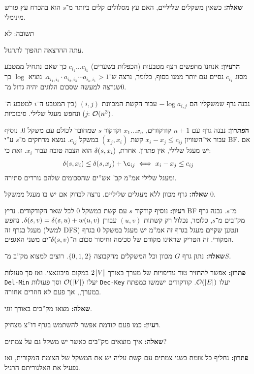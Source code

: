 \documentclass[]{../../../../tex/classes/styledArticle}
\begin{document}
	\textbf{שאלה: }כשאין משקלים שליליים, האם עץ מסלולים קלים ביותר מ־$s$ הוא בהכרח עץ פורש מינימלי. 
	
	תשובה: לא
	
	עתה ההרצאה תהפוך לתרגול. 
	
	\textbf{הרעיון: }אנחנו מחפשים רצף מטבעות (הכפלות בשערים) $c_{i_1} \dots c_{i_k}$ כך שאם נתחיל ממטבע מסוג $c_{i_1}$ נסיים עם יותר ממנו בסוף, כלומר, נרצה ש־$a_{i_1, i_2} \cdot a_{i_2, i_3} \cdots a_{i_k, i_1} > 1$. נוציא $\log$ כך שנרצה למעשה שסכום הלוגים יהיה גדול מ־$0$. 
	
	נבנה גרף שמשקליו הם $-\log a_{i, j}$ עבור הקשת המכוונת $(i, j)$ (בין המטבע ה־$i$ למטבע ה־$j$) ונחפש מעגל שלילי. סיבוכיות: $\mathcal{O}(n^{3})$. 
	
	
	\textbf{הפתרון: }נבנה גרף עם $n + 1$ קודקודים, $x_1 \dots x_n$ וקדקוד $s$ שמחובר לכולם עם משקל $0$. נוסיף עבור אי־השוויון $x_i - x_j \le c_{ij}$ קשת $(x_j, x_i)$ במשקל $c_{ij}$. נמצא מרחקים מ־$s$ ע''י BF. אם יש מעגל שלילי, אין פתרון. אחרת, $\delta(s, x_i)$ הוא הצבה טובה עבור $x_i$. זאת כי: 
	\[ \dg(s, x_i) \le \dg(s, x_j) + \c_{ij} \iff x_i - x_j \le c_{ij} \]
	ומעגל שלילי אמ''מ קב' אש''ים שהסכומים שלהם גוררים סתירה. 
	
	\textbf{שאלה: }גרף מכוון ללא מעגלים שליליים. נרצה לבדוק אם יש בו מעגל ממשקל $0$. 
	
	\textbf{רעיון: }נוסיף קודקוד $s$ עם קשת במשקל $0$ לכל שאר הקודקודים. נריץ BF מ־$s$. נבנה גרף מק''בים מ־$s$, כלומר, נכלול רק קשתות $(u, v)$ עבורן $\delta(s, v) = \delta(s, u) + w(u, v)$. נחפש מעגל בגרף זה (למשל DFS) ונטען שקיים מעגל בגרף זה אמ''מ יש מעגל במשקל $0$ בגרף המקורי. זה הטריק שראינו מקודם של סכימה וחיסור סכום ה־$\delta(s, v)$־ים משני האגפים. 
	
	\textbf{שאלה: }נתון גרף $G$ מכוון  וכל המשקלים מהקבוצה $\{0, 1, 2\}$. רוצים למצוא מק''ב מ־$S$. 
	
	\textbf{פתרון: }אפשר להחזיר טור עדיפויות של מערך באורך $2\left \lvert V \right \rvert$ במקום פיבונאצי. ואז סך פעולות \texttt{Del-Min} יעלו $\mathcal{O}(\left \lvert V \right \rvert)$ וסך פעולות \texttt{Dec-Key} יעלו $\mathcal{O}(\left \lvert E \right \rvert)$. קודקודים ישמשו כמפתח במערך,, אך פעם לא חוזרים אחורה. 
	
	\textbf{שאלה: }מצאו מק''בים באורך זוגי. 
	
	\textbf{רעיון: }כמו פעם קודמת אפשר להשתמש בגרף דו''צ מצחיק. 
	
	\textbf{שאלה: }איך מוצאים מק''בים כאשר יש משקל גם על צמתים? 
	
	\textbf{פתרון: }נחליף כל צומת בשני צמתים עם קשת עליה יש את המשקל של הצומת המקורית, ואז נפעיל את האלגוריתם הרגיל. 
	
	\ndoc
\end{document}
